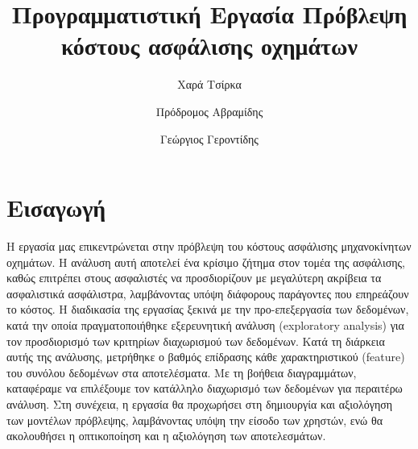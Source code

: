 \documentclass{llncs}
\begin{document}
%
\title{\Huge Προγραμματιστική Εργασία Πρόβλεψη κόστους ασφάλισης οχημάτων}
%
%
\author{\Large Χαρά Τσίρκα \and Πρόδρομος Αβραμίδης \and Γεώργιος Γεροντίδης}
%
%
%

\maketitle


\section{Εισαγωγή}
Η εργασία μας επικεντρώνεται στην πρόβλεψη του κόστους ασφάλισης μηχανοκίνητων οχημάτων. Η ανάλυση αυτή αποτελεί ένα κρίσιμο ζήτημα στον τομέα της ασφάλισης, 
καθώς επιτρέπει στους ασφαλιστές να προσδιορίζουν με μεγαλύτερη ακρίβεια τα ασφαλιστικά ασφάλιστρα, λαμβάνοντας υπόψη διάφορους παράγοντες που επηρεάζουν το κόστος.
Η διαδικασία της εργασίας ξεκινά με την προ-επεξεργασία των δεδομένων, κατά την οποία πραγματοποιήθηκε εξερευνητική ανάλυση (exploratory analysis) για τον προσδιορισμό 
των κριτηρίων διαχωρισμού των δεδομένων. Κατά τη διάρκεια αυτής της ανάλυσης, μετρήθηκε ο βαθμός επίδρασης κάθε χαρακτηριστικού (feature) του συνόλου δεδομένων στα αποτελέσματα. 
Με τη βοήθεια διαγραμμάτων, καταφέραμε να επιλέξουμε τον κατάλληλο διαχωρισμό των δεδομένων για περαιτέρω ανάλυση. Στη συνέχεια, η εργασία θα προχωρήσει στη δημιουργία και 
αξιολόγηση των μοντέλων πρόβλεψης, λαμβάνοντας υπόψη την είσοδο των χρηστών, ενώ θα ακολουθήσει η οπτικοποίηση και η αξιολόγηση των αποτελεσμάτων.
\end{document}
